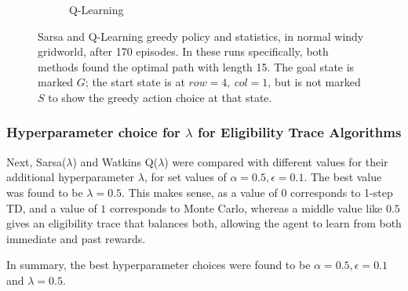 \documentclass{article}
\begin{document}
\begin{figure}[h!]
\begin{subfigure}{0.4\textwidth}
    \caption{Q-Learning}
  \end{subfigure}
  \caption{Sarsa and Q-Learning greedy policy and statistics, in normal windy gridworld, after 170 episodes. In these runs specifically, both methods found the optimal path with length 15. The goal state is marked $G$; the start state is at $row=4,\ col=1$, but is not marked $S$ to show the greedy action choice at that state.}
  \label{fig:regular_example}
\end{figure}

\subsubsection{Hyperparameter choice for $\lambda$ for Eligibility Trace Algorithms}

Next, Sarsa($\lambda$) and Watkins Q($\lambda$) were compared with different values for their additional hyperparameter $\lambda$, for set values of $\alpha = 0.5, \epsilon = 0.1$. The best value was found to be $\lambda=0.5$. This makes sense, as a value of $0$ corresponds to 1-step TD, and a value of $1$ corresponds to Monte Carlo, whereas a middle value like $0.5$ gives an eligibility trace that balances both, allowing the agent to learn from both immediate and past rewards.

In summary, the best hyperparameter choices were found to be $\alpha = 0.5, \epsilon = 0.1$ and $\lambda=0.5$.
\end{document}
